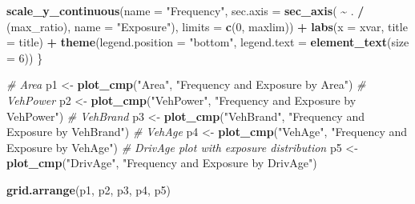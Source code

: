 \documentclass[
]{article}
\newenvironment{Shaded}{\begin{snugshade}}{\end{snugshade}}
\newcommand{\AttributeTok}[1]{\textcolor[rgb]{0.13,0.29,0.53}{#1}}
\newcommand{\CommentTok}[1]{\textcolor[rgb]{0.56,0.35,0.01}{\textit{#1}}}
\newcommand{\DecValTok}[1]{\textcolor[rgb]{0.00,0.00,0.81}{#1}}
\newcommand{\FunctionTok}[1]{\textcolor[rgb]{0.13,0.29,0.53}{\textbf{#1}}}
\newcommand{\NormalTok}[1]{#1}
\newcommand{\OtherTok}[1]{\textcolor[rgb]{0.56,0.35,0.01}{#1}}
\newcommand{\SpecialCharTok}[1]{\textcolor[rgb]{0.81,0.36,0.00}{\textbf{#1}}}
\newcommand{\StringTok}[1]{\textcolor[rgb]{0.31,0.60,0.02}{#1}}
\begin{document}
\begin{Shaded}
\begin{Highlighting}[]
    \FunctionTok{scale\_y\_continuous}\NormalTok{(}\AttributeTok{name =} \StringTok{"Frequency"}\NormalTok{, }\AttributeTok{sec.axis =} \FunctionTok{sec\_axis}\NormalTok{( }\SpecialCharTok{\textasciitilde{}}\NormalTok{ . }\SpecialCharTok{/}\NormalTok{ (max\_ratio), }\AttributeTok{name =} \StringTok{"Exposure"}\NormalTok{), }\AttributeTok{limits =} \FunctionTok{c}\NormalTok{(}\DecValTok{0}\NormalTok{, maxlim)) }\SpecialCharTok{+}
    \FunctionTok{labs}\NormalTok{(}\AttributeTok{x =}\NormalTok{ xvar, }\AttributeTok{title =}\NormalTok{ title) }\SpecialCharTok{+} \FunctionTok{theme}\NormalTok{(}\AttributeTok{legend.position =} \StringTok{"bottom"}\NormalTok{, }\AttributeTok{legend.text =} \FunctionTok{element\_text}\NormalTok{(}\AttributeTok{size =} \DecValTok{6}\NormalTok{))}
\NormalTok{\}}

\CommentTok{\# Area}
\NormalTok{p1 }\OtherTok{\textless{}{-}} \FunctionTok{plot\_cmp}\NormalTok{(}\StringTok{"Area"}\NormalTok{, }\StringTok{"Frequency and Exposure by Area"}\NormalTok{)}
\CommentTok{\# VehPower}
\NormalTok{p2 }\OtherTok{\textless{}{-}} \FunctionTok{plot\_cmp}\NormalTok{(}\StringTok{"VehPower"}\NormalTok{, }\StringTok{"Frequency and Exposure by VehPower"}\NormalTok{)}
\CommentTok{\# VehBrand}
\NormalTok{p3 }\OtherTok{\textless{}{-}} \FunctionTok{plot\_cmp}\NormalTok{(}\StringTok{"VehBrand"}\NormalTok{, }\StringTok{"Frequency and Exposure by VehBrand"}\NormalTok{)}
\CommentTok{\# VehAge}
\NormalTok{p4 }\OtherTok{\textless{}{-}} \FunctionTok{plot\_cmp}\NormalTok{(}\StringTok{"VehAge"}\NormalTok{, }\StringTok{"Frequency and Exposure by VehAge"}\NormalTok{)}
\CommentTok{\# DrivAge plot with exposure distribution}
\NormalTok{p5 }\OtherTok{\textless{}{-}} \FunctionTok{plot\_cmp}\NormalTok{(}\StringTok{"DrivAge"}\NormalTok{, }\StringTok{"Frequency and Exposure by DrivAge"}\NormalTok{)}

\FunctionTok{grid.arrange}\NormalTok{(p1, p2, p3, p4, p5)}
\end{Highlighting}
\end{Shaded}
\end{document}
